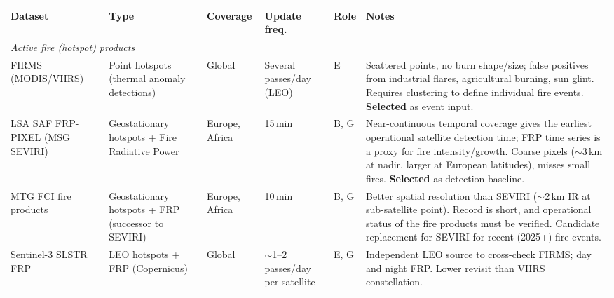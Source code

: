 \documentclass[11pt]{article}
\begin{document}
\begin{longtable}{p{2.3cm}p{2.5cm}p{1.8cm}p{1.8cm}p{0.9cm}p{4.1cm}}
\toprule
\textbf{Dataset} & \textbf{Type} & \textbf{Coverage} & \textbf{Update freq.} & \textbf{Role} & \textbf{Notes} \\
\midrule
\endhead

\multicolumn{6}{l}{\textit{Active fire (hotspot) products}} \\
\midrule
FIRMS (MODIS/\allowbreak VIIRS) & Point hotspots (thermal anomaly detections) & Global & Several passes/\allowbreak day (LEO) & E & Scattered points, no burn shape/size; false positives from industrial flares, agricultural burning, sun glint. Requires clustering to define individual fire events. \textbf{Selected} as event input. \\
LSA SAF FRP-PIXEL (MSG SEVIRI) & Geostationary hotspots + Fire Radiative Power & Europe, Africa & 15\,min & B, G & Near-continuous temporal coverage gives the earliest operational satellite detection time; FRP time series is a proxy for fire intensity/growth. Coarse pixels ($\sim$3\,km at nadir, larger at European latitudes), misses small fires. \textbf{Selected} as detection baseline. \\
MTG FCI fire products & Geostationary hotspots + FRP (successor to SEVIRI) & Europe, Africa & 10\,min & B, G & Better spatial resolution than SEVIRI ($\sim$2\,km IR at sub-satellite point). Record is short, and operational status of the fire products must be verified. Candidate replacement for SEVIRI for recent (2025+) fire events. \\
Sentinel-3 SLSTR FRP & LEO hotspots + FRP (Copernicus) & Global & $\sim$1--2 passes/\allowbreak day per satellite & E, G & Independent LEO source to cross-check FIRMS; day and night FRP. Lower revisit than VIIRS constellation. \\
\midrule


\end{longtable}
\end{document}
